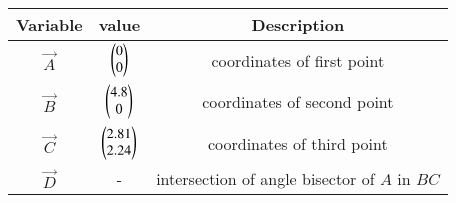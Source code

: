 \begin{tabular}[12pt]{ |c| c| c|}
    \hline
	\textbf{Variable} &\textbf{value} & \textbf{Description} \\
    \hline
	$\vec{A}$&$\begin{pmatrix}0\\0\end{pmatrix}$ &  coordinates of first point\\
    \hline 
	$\vec{B}$&$\begin{pmatrix}4.8\\0\end{pmatrix}$ & coordinates of second point\\
    \hline
	$\vec{C}$&$\begin{pmatrix}2.81\\2.24\end{pmatrix}$ & coordinates of third point\\
    \hline 	
	$\vec{D}$&- & intersection of angle bisector of $A$ in $BC$\\
    \hline
\end{tabular}
